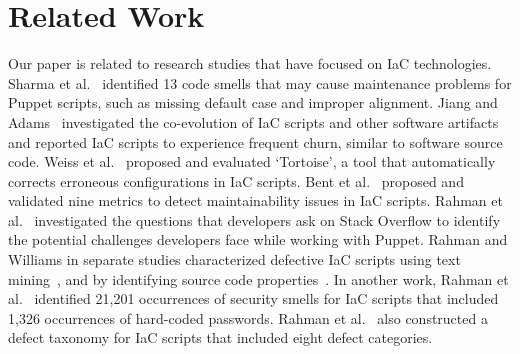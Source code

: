 \documentclass[smallextended]{svjour3}       %
\begin{document}



\section{Related Work}
\label{rel}

Our paper is related to research studies that have focused on IaC technologies. Sharma et al.~\citep{SharmaPuppet2016} identified 13 code smells that may cause maintenance problems for Puppet scripts, such as missing default case and improper alignment. Jiang and Adams~\citep{JiangAdamsMSR2015} investigated the co-evolution of IaC scripts and other software artifacts and reported IaC scripts to experience frequent churn, similar to software source code. Weiss et al.~\citep{Weiss:Tortoise} proposed and evaluated `Tortoise', a tool that automatically corrects erroneous configurations in IaC scripts. Bent et al.~\citep{Bent:Saner2018:Puppet} proposed and validated nine metrics to detect maintainability issues in IaC scripts. Rahman et al.~\citep{Rahman:RCOSE18} investigated the questions that developers ask on Stack Overflow to identify the potential challenges developers face while working with Puppet. Rahman and Williams in separate studies characterized defective IaC scripts using text mining~\citep{me:icst2018:iac}, and by identifying source code properties~\citep{me:ist2019:code:properties}. In another work, Rahman et al.~\citep{me:icse2019:slic} identified 21,201 occurrences of security smells for IaC scripts that included 1,326 occurrences of hard-coded passwords. Rahman et al.~\citep{Rahman:2020:ACID} also constructed a defect taxonomy for IaC scripts that included eight defect categories.  
\end{document}
